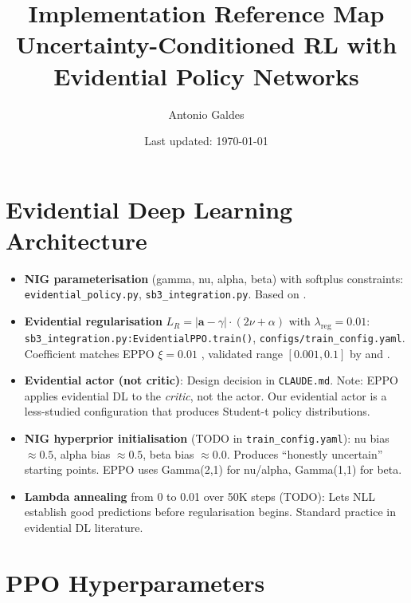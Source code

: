 \documentclass[11pt,a4paper]{article}
\title{Implementation Reference Map\\
\large Uncertainty-Conditioned RL with Evidential Policy Networks}
\author{Antonio Galdes}
\date{Last updated: \today}
\begin{document}
\maketitle

\section{Evidential Deep Learning Architecture}

\begin{itemize}[leftmargin=*]
  \item \textbf{NIG parameterisation} (gamma, nu, alpha, beta) with softplus constraints:
        \texttt{evidential\_policy.py}, \texttt{sb3\_integration.py}.
        Based on \cite{amini2020deep}.

  \item \textbf{Evidential regularisation} $L_R = |\mathbf{a} - \gamma| \cdot (2\nu + \alpha)$
        with $\lambda_\text{reg} = 0.01$:
        \texttt{sb3\_integration.py:EvidentialPPO.train()},
        \texttt{configs/train\_config.yaml}.
        Coefficient matches EPPO $\xi = 0.01$ \cite{eppo2024},
        validated range $[0.001, 0.1]$ by \cite{trustgeo2023} and \cite{soleimany2021evidential}.

  \item \textbf{Evidential actor (not critic)}: Design decision in \texttt{CLAUDE.md}.
        Note: EPPO \cite{eppo2024} applies evidential DL to the \emph{critic},
        not the actor. Our evidential actor is a less-studied configuration
        that produces Student-t policy distributions.

  \item \textbf{NIG hyperprior initialisation} (TODO in \texttt{train\_config.yaml}):
        nu bias $\approx 0.5$, alpha bias $\approx 0.5$, beta bias $\approx 0.0$.
        Produces ``honestly uncertain'' starting points.
        EPPO \cite{eppo2024} uses Gamma(2,1) for nu/alpha, Gamma(1,1) for beta.

  \item \textbf{Lambda annealing} from 0 to 0.01 over 50K steps (TODO):
        Lets NLL establish good predictions before regularisation begins.
        Standard practice in evidential DL literature.
\end{itemize}

\section{PPO Hyperparameters}
\end{document}
